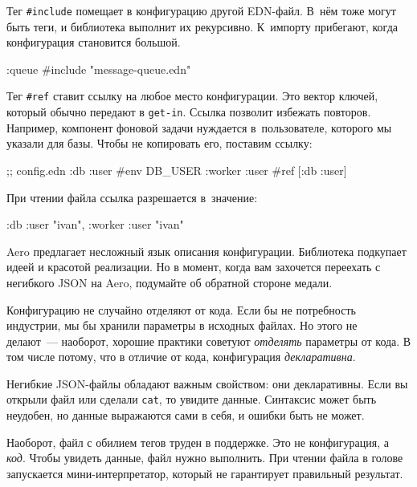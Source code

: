 Тег \verb|#include| помещает в конфигурацию другой EDN-файл. В~нём тоже могут
быть теги, и библиотека выполнит их рекурсивно. К~импорту прибегают, когда
конфигурация становится большой.

\begin{english}
  \begin{clojure}
{:queue #include "message-queue.edn"}
  \end{clojure}
\end{english}

Тег \verb|#ref| ставит ссылку на любое место конфигурации. Это вектор ключей,
который обычно передают в \verb|get-in|. Ссылка позволит избежать повторов.
Например, компонент фоновой задачи нуждается в~пользователе, которого мы указали
для базы. Чтобы не копировать его, поставим ссылку:

\begin{english}
  \begin{clojure}
;; config.edn
{:db {:user #env DB_USER}
 :worker {:user #ref [:db :user]}}
  \end{clojure}
\end{english}

\noindent
При чтении файла ссылка разрешается в~значение:

\begin{english}
  \begin{clojure}
{:db {:user "ivan"}, :worker {:user "ivan"}}
  \end{clojure}
\end{english}

Aero предлагает несложный язык описания конфигурации. Библиотека подкупает идеей
и красотой реализации. Но в момент, когда вам захочется переехать с негибкого
JSON на Aero, подумайте об обратной стороне медали.


Конфигурацию не случайно отделяют от кода. Если бы не потребность индустрии, мы
бы хранили параметры в исходных файлах. Но этого не делают~--- наоборот, хорошие
практики советуют \emph{отделять} параметры от кода. В том числе потому, что в
отличие от кода, конфигурация \emph{декларативна}.

Негибкие JSON-файлы обладают важным свойством: они декларативны. Если вы открыли
файл или сделали \verb|cat|, то увидите данные. Синтаксис может быть неудобен,
но данные выражаются сами в себя, и ошибки быть не может.

Наоборот, файл с обилием тегов труден в поддержке. Это не конфигурация,
а \emph{код}. Чтобы увидеть данные, файл нужно выполнить. При чтении
файла в голове запускается мини-интерпретатор, который не гарантирует
правильный результат.

